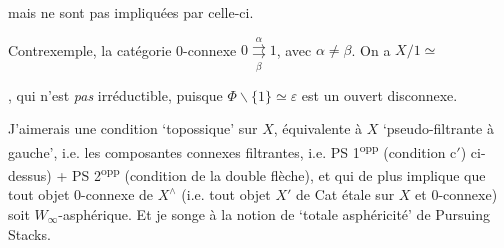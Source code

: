 \documentclass[11pt]{article}
\newcommand{\msp}[1]{\marginpar{\footnotesize [#1]}}
\begin{document}
\msp{page 15}

\noindent mais ne sont pas impliquées par celle-ci.

Contrexemple, la catégorie 0-connexe $0 \underset{\beta}{\overset{\alpha}{\rightrightarrows}} 1$, avec $\alpha \neq \beta$. On a $X/1 \simeq$
, qui n'est \textit{pas} irréductible, puisque $\Phi \backslash \{1\} \simeq \varepsilon$ est un ouvert disconnexe.

J'aimerais une condition `topossique' sur $X$, équivalente à $X$ `pseudo-filtrante à gauche', i.e. les composantes connexes filtrantes, i.e. PS 1\textsuperscript{opp} (condition c$'$) ci-dessus) + PS 2\textsuperscript{opp} (condition de la double flèche), et qui de plus implique que tout objet 0-connexe de $X^{\wedge}$ (i.e. tout objet $X'$ de Cat étale sur $X$ et 0-connexe) soit $W_{\infty}$-asphérique. Et je songe à la notion de `totale asphéricité' de Pursuing Stacks.
\end{document}
